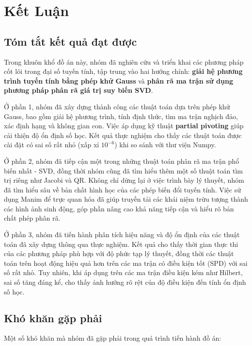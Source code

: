 \chapter{Kết Luận}

\newpage

\section{Tóm tắt kết quả đạt được}

Trong khuôn khổ đồ án này, nhóm đã nghiên cứu và triển khai các phương pháp cốt lõi trong đại số tuyến tính, tập trung vào hai hướng chính: \textbf{giải hệ phương trình tuyến tính bằng phép khử Gauss} và \textbf{phân rã ma trận sử dụng phương pháp phân rã giá trị suy biến SVD}.

Ở phần 1, nhóm đã xây dựng thành công các thuật toán dựa trên phép khử Gauss, bao gồm giải hệ phương trình, tính định thức, tìm ma trận nghịch đảo, xác định hạng và không gian con. Việc áp dụng kỹ thuật \textbf{partial pivoting} giúp cải thiện độ ổn định số học. Kết quả thực nghiệm cho thấy các thuật toán được cài đặt có sai số rất nhỏ (xấp xỉ $10^{-6}$) khi so sánh với thư viện Numpy.

Ở phần 2, nhóm đã tiếp cận một trong những thuật toán phân rã ma trận phổ biến nhất - SVD, đồng thời nhóm cũng đã tìm hiểu thêm một số thuật toán tìm trị riêng như Jacobi và QR. Không chỉ dừng lại ở việc trình bày lý thuyết, nhóm đã tìm hiểu sâu về bản chất hình học của các phép biến đổi tuyến tính. Việc sử dụng Manim để trực quan hóa đã giúp truyền tải các khái niệm trừu tượng thành các hình ảnh sinh động, góp phần nâng cao khả năng tiếp cận và hiểu rõ bản chất phép phân rã.

Ở phần 3, nhóm đã tiến hành phân tích hiệu năng và độ ổn định của các thuật toán đã xây dựng thông qua thực nghiệm. Kết quả cho thấy thời gian thực thi của các phương pháp phù hợp với độ phức tạp lý thuyết, đồng thời các thuật toán trên hoạt động hiệu quả hơn trên các ma trận có điều kiện tốt (SPD) với sai số rất nhỏ. Tuy nhiên, khi áp dụng trên các ma trận điều kiện kém như Hilbert, sai số tăng đáng kể, cho thấy ảnh hưởng rõ rệt của độ điều kiện đến tính ổn định số học.

\section{Khó khăn gặp phải}

Một số khó khăn mà nhóm đã gặp phải trong quá trình tiến hành đồ án:

